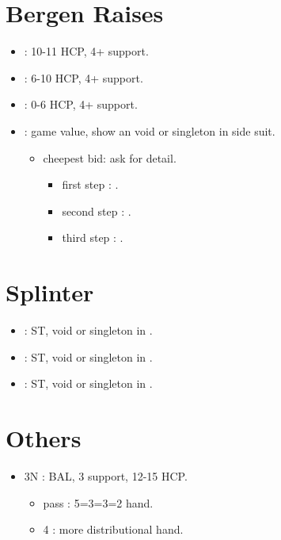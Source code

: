 \documentclass[12pt,twoside,a5paper]{report}%
\begin{document}
	\section*{Bergen Raises}
	\begin{itemize}
	\renewcommand{\labelitemi}{}
	\item {} : 10-11 HCP, 4+\sp{} support.
	\item {} : 6-10 HCP, 4+\sp{} support.
	\item {} : 0-6 HCP, 4+\sp{} support.
	\item {} : game value, show an void or singleton in side suit.
		\begin{itemize}
		\renewcommand{\labelitemi}{--}
		\item cheepest bid: ask for detail.
			\begin{itemize}
			\renewcommand{\labelitemi}{--}
				\item first step : \cl{}.
				\item second step : \di{}.
				\item third step : \sp{}.
			\end{itemize}
		\end{itemize}
	\end{itemize}

	\section*{Splinter}
	\begin{itemize}
	\renewcommand{\labelitemi}{}
	\item {} : ST, void or singleton in \cl{}.
	\item {} : ST, void or singleton in \di{}.
	\item {} : ST, void or singleton in \he{}.
	\end{itemize}

	\section*{Others}
	\begin{itemize}
	\renewcommand{\labelitemi}{}
	\item 3N : BAL, 3\sp{} support, 12-15 HCP.
		\begin{itemize}
		\renewcommand{\labelitemi}{--}
		\item pass : 5=3=3=2 hand.
		\item 4\sp{} : more distributional hand.
		\end{itemize}
	\end{itemize}
	
\end{document}
